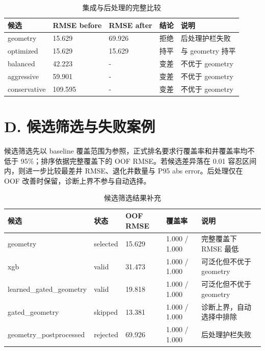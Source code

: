 \documentclass[openany]{Template_ECNU_Undergraduate_202505/ecnuundergraduate}
\newcommand{\appendixreset}[1]{%
  \setcounter{table}{0}%
  \setcounter{figure}{0}%
  \renewcommand{\thetable}{#1-\arabic{table}}%
  \renewcommand{\thefigure}{#1-\arabic{figure}}%
}
\begin{document}
\begin{table}[H]
\centering
\small
\begin{tabular}{@{}p{4.2cm}p{1.8cm}p{2.2cm}p{2.2cm}p{2.0cm}@{}}
\toprule
候选 & RMSE before & RMSE after & 结论 & 说明 \\
\midrule
geometry & 15.629 & 69.926 & 拒绝 & 后处理护栏失败 \\
optimized & 15.629 & 15.629 & 持平 & 与 geometry 持平 \\
balanced & 42.223 & - & 变差 & 不优于 geometry \\
aggressive & 59.901 & - & 变差 & 不优于 geometry \\
conservative & 109.595 & - & 变差 & 不优于 geometry \\
\bottomrule
\end{tabular}
\caption{集成与后处理的完整比较}
\end{table}

\section*{D. 候选筛选与失败案例}
\appendixreset{D}
\noindent 候选筛选先以 baseline 覆盖范围为参照，正式排名要求行覆盖率和井覆盖率均不低于 95\%；排序依据完整覆盖下的 OOF RMSE。若候选差异落在 0.01 容忍区间内，则进一步比较最差井 RMSE、退化井数量与 P95 abs error。后处理仅在 OOF 改善时保留，诊断上界不参与自动选择。

\begin{table}[H]
\centering
\small
\begin{tabularx}{0.97\textwidth}{@{}p{3.7cm}p{2.3cm}p{2.1cm}p{2.2cm}X@{}}
\toprule
候选 & 状态 & OOF RMSE & 覆盖率 & 说明 \\
\midrule
geometry & selected & 15.629 & 1.000 / 1.000 & 完整覆盖下 RMSE 最低 \\
xgb & valid & 31.473 & 1.000 / 1.000 & 可泛化但不优于 geometry \\
learned\_gated\_geometry & valid & 19.818 & 1.000 / 1.000 & 可泛化但不优于 geometry \\
gated\_geometry & skipped & 13.381 & 1.000 / 1.000 & 诊断上界，自动选择中排除 \\
geometry\_postprocessed & rejected & 69.926 & 1.000 / 1.000 & 后处理护栏失败 \\
\bottomrule
\end{tabularx}
\caption{候选筛选结果补充}
\end{table}
\end{document}
